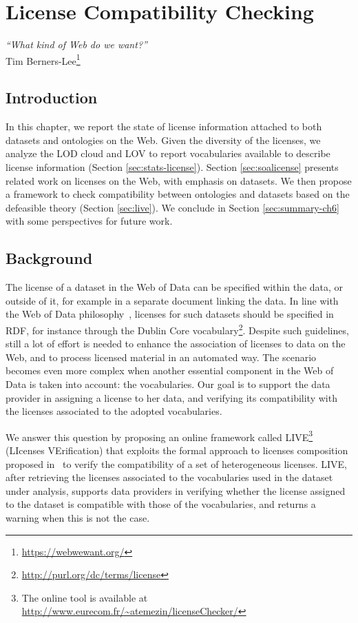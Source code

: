 \chapter{License Compatibility Checking}
\label{ch:ch7}
\begin{flushright}
\textit{``What kind of Web do we want?''} \\
 Tim Berners-Lee\footnote{\url{https://webwewant.org/}}
 \end{flushright}

\section*{Introduction}
In this chapter, we report the state of license information attached to both datasets and ontologies on the Web. Given the diversity of the licenses, we analyze the LOD cloud and LOV to report vocabularies available to describe license information (Section \ref{sec:stats-license}). Section \ref{sec:soalicense} presents related work on licenses on the Web, with emphasis on datasets. We then propose a framework to check compatibility between ontologies and datasets based on the defeasible theory (Section \ref{sec:live}). We conclude in Section \ref{sec:summary-ch6} with some perspectives for future work.

\section{Background}
The license of a dataset in the Web of Data can be specified within the data, or outside of it, for example in a separate document linking the data. In line with the Web of Data philosophy~\cite{LinkedData2011}, licenses for such datasets should be specified in RDF, for instance through the Dublin Core vocabulary\footnote{\url{http://purl.org/dc/terms/license}}. Despite such guidelines, still a lot of effort is needed to enhance the association of licenses to data on the Web, and to process licensed material in an automated way. The scenario becomes even more complex when another essential component in the Web of Data is taken into account: the vocabularies. Our goal is to support the data provider in assigning a license to her data, and verifying its compatibility with the licenses associated to the adopted vocabularies.

We answer this question by proposing an online framework called LIVE\footnote{The online tool is available at \url{http://www.eurecom.fr/~atemezin/licenseChecker/}} (LIcenses VErification) that exploits the formal approach to licenses composition proposed in~\cite{DBLP:conf/semweb/GovernatoriRVG13} to verify the compatibility of a set of heterogeneous licenses. LIVE, after retrieving the licenses associated to the vocabularies used in the dataset under analysis, supports data providers in verifying whether the license assigned to the dataset is compatible with those of the vocabularies, and returns a warning when this is not the case.

